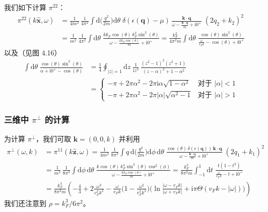 我们如下计算 $\pi^{22}$：
\begin{align*}
\pi^{22}(k\hat{\pmb{x}},\omega)
&= \frac{1}{4m^{2}}\, \frac{1}{4\pi^{2}} \int \mathrm{d}\Big(\frac{q^{2}}{2m}\Big) \mathrm{d}\theta\;
\delta(\epsilon(\pmb{q}) - \mu)\, \frac{\pmb{k}\cdot\pmb{q}}{\omega - \frac{\pmb{k}\cdot\pmb{q}}{m} + \mathrm{i}0^{+}}\; (2q_{2} + k_{2})^{2}\\
&= \frac{1}{m^{2}}\, \frac{1}{4\pi^{2}} \int \mathrm{d}\theta\;
\frac{k k_{F} \cos(\theta)\, k_{F}^{2} \sin^{2}(\theta)}{\omega - \frac{k k_{F}\cos(\theta)}{m} + \mathrm{i}0^{+}}
= \frac{k_{F}^{2}}{4\pi^{2} m} \int \mathrm{d}\theta\;
\frac{\cos(\theta) \sin^{2}(\theta)}{\frac{\omega}{v_{F} k} - \cos(\theta) + \mathrm{i}0^{+}}
\end{align*}
以及（见图 4.16）
\begin{align*}
\int \mathrm{d}\theta\; \frac{\cos(\theta) \sin^{2}(\theta)}{\alpha + \mathrm{i}0^{+} - \cos(\theta)}
&= \frac{1}{4} \oint_{|z|=1} \mathrm{d}z\; \frac{1}{\mathrm{i} z^{3}}\, \frac{(z^{2}-1)^{2}(z^{2}+1)}{(z-\alpha)^{2} + 1 - \alpha^{2}}\\
&= \left\{
\begin{array}{ll}
-\pi + 2\pi\alpha^{2} - 2\pi \mathrm{i} \alpha \sqrt{1-\alpha^{2}} & \text{对于 } |\alpha| < 1\\
-\pi + 2\pi\alpha^{2} - 2\pi |\alpha| \sqrt{\alpha^{2}-1} & \text{对于 } |\alpha| > 1
\end{array} \right.
\end{align*}

\subsubsection{三维中 $\pi^{\perp}$ 的计算}

为计算 $\pi^{\perp}$，我们可取 $\pmb{k} = (0, 0, k)$ 并利用
\begin{align*}
\pi^{\perp}(\omega, k) &= \pi^{11}(k\hat{\pmb{z}}, \omega)
= \frac{1}{4m^{2}}\, \frac{1}{8\pi^{3}} \int q\, \mathrm{d}\Big(\frac{q^{2}}{2m}\Big) \mathrm{d}\phi\, \mathrm{d}\theta\;
\frac{\cos(\theta)\, \delta(\epsilon(\pmb{q}))\, \pmb{k}\cdot\pmb{q}}{\omega - \frac{\pmb{k}\cdot\pmb{q}}{m} + \mathrm{i}0^{+}}\; (2q_{1} + k_{1})^{2}\\
&= \frac{1}{m^{2}}\, \frac{1}{8\pi^{3}} \int \mathrm{d}\phi\, \mathrm{d}\theta\;
\frac{k \cos(\theta)\, k_{F}^{4} \sin^{3}(\theta) \cos^{2}(\phi)}{\omega - \frac{k k_{F}\cos(\theta)}{m} + \mathrm{i}0^{+}}
= \frac{k_{F}^{3}}{8\pi^{2} m} \int_{-1}^{1} \mathrm{d}t\; \frac{t(1-t^{2})}{\frac{\omega}{v_{F} k} - t + \mathrm{i}0^{+}}\\
&= \frac{k_{F}^{3}}{8\pi^{2} m} \left( -\frac{4}{3} + 2\frac{\omega^{2}}{v_{F}^{2} k^{2}}
- \frac{\omega}{v_{F} k} \Big( 1 - \frac{\omega^{2}}{v_{F}^{2} k^{2}} \Big)
\Big( \ln \frac{|\omega - v_{F} k|}{|\omega + v_{F} k|} + \mathrm{i}\pi \Theta(v_{F} k - |\omega|) \Big) \right)
\end{align*}
我们还注意到 $\rho = k_{F}^{3}/6\pi^{2}$。

